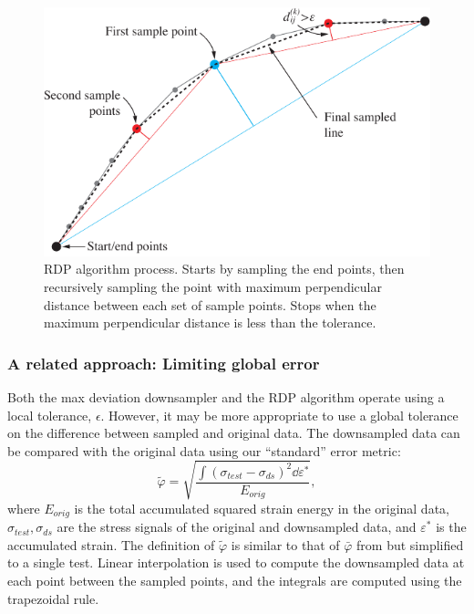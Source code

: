 \documentclass[a4paper,11pt]{article}
\begin{document}
\begin{figure}
    \centering
    \includegraphics[scale=1]{rdp_illustration.pdf}
    \caption{RDP algorithm process. Starts by sampling the end points, then recursively sampling the point with maximum perpendicular distance between each set of sample points. Stops when the maximum perpendicular distance is less than the tolerance.}
    \label{fig:rdp-algo}
\end{figure}

\subsubsection{A related approach: Limiting global error}

Both the max deviation downsampler and the RDP algorithm operate using a local tolerance, $\epsilon$.
However, it may be more appropriate to use a global tolerance on the difference between sampled and original data.
The downsampled data can be compared with the original data using our ``standard'' error metric:
\begin{equation}
    \tilde{\varphi} = \sqrt{\frac{\int (\sigma_{test} - \sigma_{ds})^2 \dd \varepsilon^*}{E_{orig}}},
\end{equation}
where $E_{orig}$ is the total accumulated squared strain energy in the original data, $\sigma_{test}, \sigma_{ds}$ are the stress signals of the original and downsampled data, and $\varepsilon^*$ is the accumulated strain.
The definition of $\tilde{\varphi}$ is similar to that of $\bar{\varphi}$ from \citet{deCastroeSousaConsistencySolvingInverse2020} but simplified to a single test.
Linear interpolation is used to compute the downsampled data at each point between the sampled points, and the integrals are computed using the trapezoidal rule.
\end{document}
